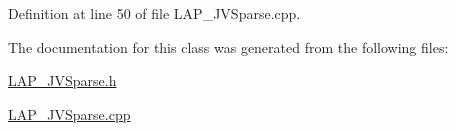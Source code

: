 Definition at line 50 of file L\+A\+P\+\_\+\+J\+V\+Sparse.\+cpp.



The documentation for this class was generated from the following files\+:\begin{DoxyCompactItemize}
\item 
\hyperlink{LAP__JVSparse_8h}{L\+A\+P\+\_\+\+J\+V\+Sparse.\+h}\item 
\hyperlink{LAP__JVSparse_8cpp}{L\+A\+P\+\_\+\+J\+V\+Sparse.\+cpp}\end{DoxyCompactItemize}
